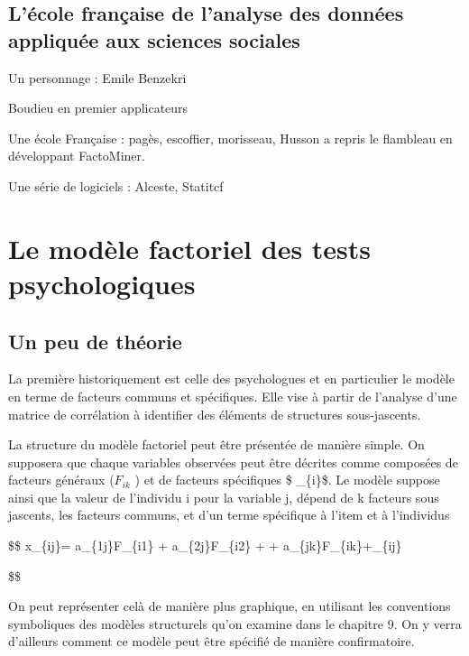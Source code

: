 \documentclass[
]{book}
\begin{document}
\hypertarget{luxe9cole-franuxe7aise-de-lanalyse-des-donnuxe9es-appliquuxe9e-aux-sciences-sociales}{%
\subsection{L'école française de l'analyse des données appliquée aux sciences sociales}\label{luxe9cole-franuxe7aise-de-lanalyse-des-donnuxe9es-appliquuxe9e-aux-sciences-sociales}}

Un personnage : Emile Benzekri

Boudieu en premier applicateurs

Une école Française : pagès, escoffier, morisseau, Husson a repris le flambleau en développant FactoMiner.

Une série de logiciels : Alceste, Statitcf

\hypertarget{le-moduxe8le-factoriel-des-tests-psychologiques}{%
\section{Le modèle factoriel des tests psychologiques}\label{le-moduxe8le-factoriel-des-tests-psychologiques}}

\hypertarget{un-peu-de-thuxe9orie}{%
\subsection{Un peu de théorie}\label{un-peu-de-thuxe9orie}}

La première historiquement est celle des psychologues et en particulier le modèle en terme de facteurs communs et spécifiques. Elle vise à partir de l'analyse d'une matrice de corrélation à identifier des éléments de structures sous-jascents.

La structure du modèle factoriel peut être présentée de manière simple. On supposera que chaque variables observées peut être décrites comme composées de facteurs généraux (\(F_{ik}\) ) et de facteurs spécifiques \$ \varepsilon\_\{i\}\$. Le modèle suppose ainsi que la valeur de l'individu i pour la variable j, dépend de k facteurs sous jascents, les facteurs communs, et d'un terme spécifique à l'item et à l'individus

\$\$
x\_\{ij\}= a\_\{1j\}F\_\{i1\} + a\_\{2j\}F\_\{i2\} + \cdots + a\_\{jk\}F\_\{ik\}+\varepsilon\_\{ij\}

\$\$

On peut représenter celà de manière plus graphique, en utilisant les conventions symboliques des modèles structurels qu'on examine dans le chapitre 9. On y verra d'ailleurs comment ce modèle peut être spécifié de manière confirmatoire.
\end{document}

